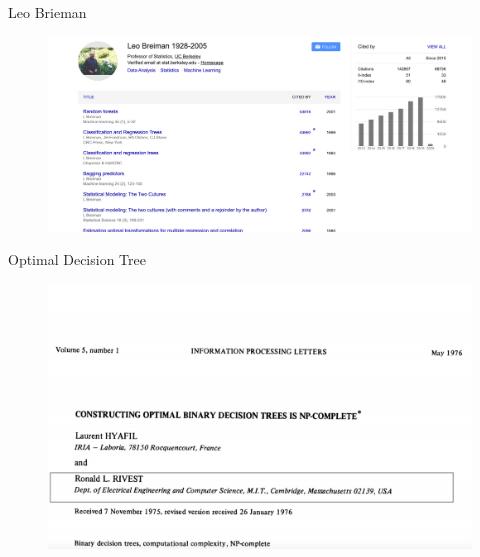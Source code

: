 \documentclass[usenames,dvipsnames]{beamer}
\begin{document}
\begin{frame}{Leo Brieman}
\begin{figure}
	\centering
	\includegraphics[width=1\linewidth]{../assets/decision-trees/diagrams/brieman}

	\label{fig:brieman}
\end{figure}

\end{frame}

\begin{frame}{Optimal Decision Tree}
\begin{figure}
	\centering
	\includegraphics[width=1\linewidth]{../assets/decision-trees/diagrams/NP-hard}

	\label{fig:np-hard}
\end{figure}

\end{frame}
\end{document}
